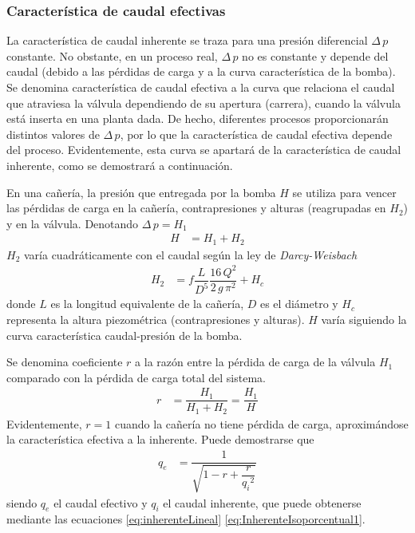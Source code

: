 \subsubsection{Característica de caudal efectivas}

La característica de caudal inherente se traza para una presión diferencial
$\Delta \,p$ constante.
No obstante, en un proceso real, $\Delta \,p$ no es constante y depende del
caudal (debido a las pérdidas de carga y a la curva característica de la bomba).
Se denomina característica de caudal efectiva a la curva que relaciona el
caudal que atraviesa la válvula dependiendo de su apertura (carrera), cuando la
válvula está inserta en una planta dada.
De hecho, diferentes procesos proporcionarán distintos valores de  $\Delta
\,p$, por lo que la característica de caudal efectiva depende del proceso.
Evidentemente, esta curva se apartará de la característica de caudal inherente,
como se demostrará a continuación.

En una cañería, la presión que entregada por la bomba $H$ se utiliza para
vencer las pérdidas de carga en la cañería, contrapresiones y alturas
(reagrupadas en $H_2$) y en la válvula.
Denotando $\Delta \,p = H_1$
\begin{align}
 H &= H_1 + H_2
\end{align}
$H_2$ varía cuadráticamente con el caudal según la ley de \emph{Darcy-Weisbach}
\cite{bib:Franzini}
\begin{align}
 H_2  &= f \dfrac{L}{D^5}\dfrac{16\,Q^2}{2\,g\,\pi^2} + H_c
\end{align}
donde $L$ es la longitud equivalente de la cañería, $D$ es el diámetro y $H_c$
representa la altura piezométrica (contrapresiones y alturas).
$H$ varía siguiendo la curva característica caudal-presión de la bomba.

Se denomina coeficiente $r$ a la razón entre la pérdida de carga de la válvula
$H_1$ comparado con la pérdida de carga total del sistema.
\begin{align}
 r &= \dfrac{H_1}{H_1+H_2} = \dfrac{H_1}{H}
\end{align}
Evidentemente, $r = 1$ cuando la cañería no tiene pérdida de carga,
aproximándose la característica efectiva a la inherente.
Puede demostrarse \cite{bib:Creus} que
\begin{align}
 q_e &= \dfrac{1}{\sqrt{1-r+\dfrac{r}{{q_i}^2}}}
 \label{eq:coef_r_qe_qi}
\end{align}
siendo $q_e$ el caudal efectivo y $q_i$ el caudal inherente, que puede
obtenerse mediante las ecuaciones \eqref{eq:inherenteLineal}
\eqref{eq:InherenteIsoporcentual1}.

